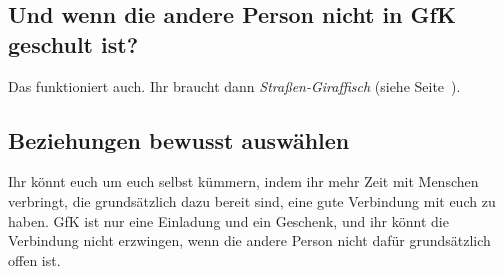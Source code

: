 \subsection{Und wenn die andere Person nicht in GfK geschult ist?}

Das funktioniert auch. Ihr braucht dann \emph{Straßen-Giraffisch} (siehe Seite~\pageref{strassengiraffisch}).


\subsection{Beziehungen bewusst auswählen}

Ihr könnt euch um euch selbst kümmern, indem ihr mehr Zeit mit Menschen verbringt, die grundsätzlich dazu bereit sind, eine gute Verbindung mit euch zu haben. GfK ist nur eine Einladung und ein Geschenk, und ihr könnt die Verbindung nicht erzwingen, wenn die andere Person nicht dafür grundsätzlich offen ist.
